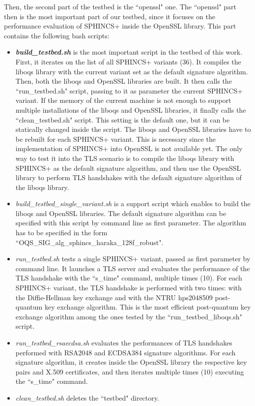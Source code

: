 \documentclass[a4paper,12pt]{article}
\begin{document}
Then, the second part of the testbed is the ``openssl" one. The ``openssl" part then is the most important part of our testbed, since it focuses on the performance evaluation of SPHINCS+ inside the OpenSSL library. This part contains the following bash scripts:
\begin{itemize}
    \item \textit{\textbf{build\_testbed.sh}} is the most important script in the testbed of this work. First, it iterates on the list of all SPHINCS+ variants (36). It compiles the liboqs library with the current variant set as the default signature algorithm. Then, both the liboqs and OpenSSL libraries are built. It then calls the ``run\_testbed.sh" script, passing to it as parameter the current SPHINCS+ variant.
    If the memory of the current machine is not enough to support multiple installations of the liboqs and OpenSSL libraries, it finally calls the ``clean\_testbed.sh" script. This setting is the default one, but it can be statically changed inside the script.
    The liboqs and OpenSSL libraries have to be rebuilt for each SPHINCS+ variant. This is necessary since the implementation of SPHINCS+ into OpenSSL is not available yet. The only way to test it into the TLS scenario is to compile the liboqs library with SPHINCS+ as the default signature algorithm, and then use the OpenSSL library to perform TLS handshakes with the default signature algorithm of the liboqs library.
    \item \textit{build\_testbed\_single\_variant.sh} is a support script which enables to build the liboqs and OpenSSL libraries. The default signature algorithm can be specified with this script by command line as first parameter. The algorithm has to be specified in the form ``OQS\_SIG\_alg\_sphincs\_haraka\_128f\_robust".
    \item \textit{run\_testbed.sh} tests a single SPHINCS+ variant, passed as first parameter by command line. It launches a TLS server and evaluates the performance of the TLS handshake with the ``s\_time" command, multiple times (10). For each SPHINCS+ variant, the TLS handshake is performed with two times: with the Diffie-Hellman key exchange and with the NTRU hps2048509 post-quantum key exchange algorithm. This is the most efficient post-quantum key exchange algorithm among the ones tested by the ``run\_testbed\_liboqs.sh" script.
    \item \textit{run\_testbed\_rsaecdsa.sh} evaluates the performances of TLS handshakes performed with RSA2048 and ECDSA384 signature algorithms.
    For each signature algorithm, it creates inside the OpenSSL library the respective key pairs and X.509 certificates, and then iterates multiple times (10) executing the ``s\_time" command.
    \item \textit{clean\_testbed.sh} deletes the ``testbed" directory.
\end{itemize}
\end{document}

